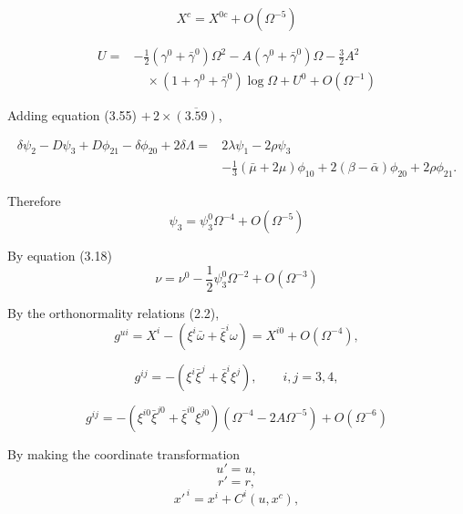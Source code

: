 \begin{equation}
X^{c}
=
X^{0c}
+
O(\Omega^{-5})
\tag{6.36}
\end{equation}

\begin{equation}
\begin{aligned}
U
={}&
-\frac{1}{2}
\left(
\gamma^{0}
+
\bar{\gamma}^{0}
\right)\Omega^{2}
-
A\left(
\gamma^{0}
+
\bar{\gamma}^{0}
\right)\Omega
-
\frac{3}{2}A^{2}
\\
&\quad\times
\left(
1+
\gamma^{0}
+
\bar{\gamma}^{0}
\right)\log\Omega
+
U^{0}
+
O(\Omega^{-1})
\end{aligned}
\tag{6.37}
\end{equation}

Adding equation (3.55) $+\,2\times\overline{(3.59)}$,

\begin{equation}
\begin{aligned}
\delta\psi_{2}
-
D\psi_{3}
+
D\phi_{21}
-
\delta\phi_{20}
+
2\delta\Lambda
={}&
2\lambda\psi_{1}
-
2\rho\psi_{3}
\\
&-
\frac{1}{3}
\left(
\bar{\mu}+2\mu
\right)\phi_{10}
+
2(\beta-\bar{\alpha})\phi_{20}
+
2\rho\phi_{21}.
\end{aligned}
\tag{6.38}
\end{equation}


Therefore
\begin{equation}
\psi_3
=
\psi_3^{0}\Omega^{-4}
+
O(\Omega^{-5})
\tag{6.39}
\end{equation}

By equation (3.18)
\begin{equation}
\nu
=
\nu^{0}
-
\frac{1}{2}\psi_3^{0}\Omega^{-2}
+
O(\Omega^{-3})
\tag{6.40}
\end{equation}

By the orthonormality relations (2.2),
\[
g^{ui}
=
X^i
-
\left(
\xi^i\bar{\omega}
+
\bar{\xi}^i\omega
\right)
=
X^{i0}
+
O(\Omega^{-4}),
\]

\[
g^{ij}
=
-\left(
\xi^i\bar{\xi}^j
+
\bar{\xi}^i\xi^j
\right),
\qquad i,j=3,4,
\]

\begin{equation}
g^{ij}
=
-\left(
\xi^{i0}\bar{\xi}^{j0}
+
\bar{\xi}^{i0}\xi^{j0}
\right)
\left(
\Omega^{-4}
-
2A\Omega^{-5}
\right)
+
O(\Omega^{-6})
\tag{6.41}
\end{equation}

By making the coordinate transformation
\[
u' = u,
\]
\[
r' = r,
\]
\[
x'^{\,i}
=
x^i
+
C^i(u,x^c),
\]

